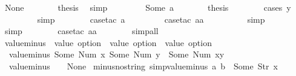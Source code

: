 \begin{isabellebody}
\ None\isanewline
\ \ \ \ \isamarkupfalse%
\ \isamarkupfalse%
\ {\isacharquery}thesis\ \isamarkupfalse%
\ simp\isanewline
\ \ \isamarkupfalse%
\isanewline
\ \ \ \ \isamarkupfalse%
\ {\isacharparenleft}Some\ a{\isacharparenright}\isanewline
\ \ \ \ \isamarkupfalse%
\ \isamarkupfalse%
\ {\isacharquery}thesis\isanewline
\ \ \ \ \ \ \isamarkupfalse%
\ {\isacharparenleft}cases\ y{\isacharparenright}\isanewline
\ \ \ \ \ \ \ \isamarkupfalse%
\ simp\isanewline
\ \ \ \ \ \ \isamarkupfalse%
\ {\isacharparenleft}case{\isacharunderscore}tac\ a{\isacharparenright}\isanewline
\ \ \ \ \ \ \ \isamarkupfalse%
\ {\isacharparenleft}case{\isacharunderscore}tac\ aa{\isacharparenright}\isanewline
\ \ \ \ \ \ \ \ \isamarkupfalse%
\ simp\isanewline
\ \ \ \ \ \ \ \isamarkupfalse%
\ simp\isanewline
\ \ \ \ \ \ \isamarkupfalse%
\ {\isacharparenleft}case{\isacharunderscore}tac\ aa{\isacharparenright}\isanewline
\ \ \ \ \ \ \isamarkupfalse%
\ simp{\isacharunderscore}all\isanewline
\ \ \isamarkupfalse%
%
\endisatagproof
{\isafoldproof}%
%
\isadelimproof
\isanewline
%
\endisadelimproof
\isanewline
{}\isamarkupfalse%
\ value{\isacharunderscore}minus\ {\isacharcolon}{\isacharcolon}\ {\isachardoublequoteopen}value\ option\ {\isasymRightarrow}\ value\ option\ {\isasymRightarrow}\ value\ option{\isachardoublequoteclose}\ \ \isanewline
\ \ {\isachardoublequoteopen}value{\isacharunderscore}minus\ {\isacharparenleft}Some\ {\isacharparenleft}Num\ x{\isacharparenright}{\isacharparenright}\ {\isacharparenleft}Some\ {\isacharparenleft}Num\ y{\isacharparenright}{\isacharparenright}\ {\isacharequal}\ Some\ {\isacharparenleft}Num\ {\isacharparenleft}x{\isacharminus}y{\isacharparenright}{\isacharparenright}{\isachardoublequoteclose}\ {\isacharbar}\isanewline
\ \ {\isachardoublequoteopen}value{\isacharunderscore}minus\ {\isacharunderscore}\ {\isacharunderscore}\ {\isacharequal}\ None{\isachardoublequoteclose}\isanewline
\isanewline
{}\isamarkupfalse%
\ minus{\isacharunderscore}no{\isacharunderscore}string\ {\isacharbrackleft}simp{\isacharbrackright}{\isacharcolon}{\isachardoublequoteopen}value{\isacharunderscore}minus\ a\ b\ {\isasymnoteq}\ Some\ {\isacharparenleft}Str\ x{\isacharparenright}{\isachardoublequoteclose}\isanewline
%
\isadelimproof
\ \ %
\endisadelimproof
%
\isatagproof
{}\isamarkupfalse%

\end{isabellebody}
